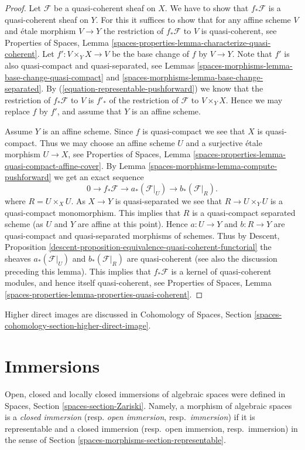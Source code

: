 \begin{proof}
Let $\mathcal{F}$ be a quasi-coherent sheaf on $X$. We have to show that
$f_*\mathcal{F}$ is a quasi-coherent sheaf on $Y$. For this it suffices
to show that for any affine scheme $V$ and \'etale morphism $V \to Y$
the restriction of $f_*\mathcal{F}$ to $V$ is quasi-coherent, see
Properties of Spaces,
Lemma \ref{spaces-properties-lemma-characterize-quasi-coherent}.
Let $f' : V \times_Y X \to V$
be the base change of $f$ by $V \to Y$. Note that $f'$ is also
quasi-compact and quasi-separated, see
Lemmas \ref{spaces-morphisms-lemma-base-change-quasi-compact} and
\ref{spaces-morphisms-lemma-base-change-separated}.
By (\ref{equation-representable-pushforward})
we know that the restriction of $f_*\mathcal{F}$ to $V$ is $f'_*$ of the
restriction of $\mathcal{F}$ to $V \times_Y X$. Hence
we may replace $f$ by $f'$, and assume that $Y$ is an affine scheme.

\medskip\noindent
Assume $Y$ is an affine scheme. Since $f$ is quasi-compact we see that $X$
is quasi-compact. Thus we may choose an affine scheme $U$ and a surjective
\'etale morphism $U \to X$, see
Properties of Spaces,
Lemma \ref{spaces-properties-lemma-quasi-compact-affine-cover}.
By Lemma \ref{spaces-morphisms-lemma-compute-pushforward} we get an exact sequence
$$
0 \to f_*\mathcal{F} \to a_*(\mathcal{F}|_U) \to b_*(\mathcal{F}|_R).
$$
where $R = U \times_X U$.
As $X \to Y$ is quasi-separated we see that $R \to U \times_Y U$
is a quasi-compact monomorphism. This implies that $R$ is a quasi-compact
separated scheme (as $U$ and $Y$ are affine at this point).
Hence $a : U \to Y$ and $b : R \to Y$ are quasi-compact and
quasi-separated morphisms of schemes. Thus by
Descent,
Proposition \ref{descent-proposition-equivalence-quasi-coherent-functorial}
the sheaves $a_*(\mathcal{F}|_U)$ and $b_*(\mathcal{F}|_R)$
are quasi-coherent (see also the discussion preceding this lemma).
This implies that $f_*\mathcal{F}$ is a kernel of
quasi-coherent modules, and hence itself quasi-coherent, see
Properties of Spaces,
Lemma \ref{spaces-properties-lemma-properties-quasi-coherent}.
\end{proof}

Higher direct images are discussed in
Cohomology of Spaces, Section
\ref{spaces-cohomology-section-higher-direct-image}.

\section{Immersions}
\label{spaces-morphisms-section-immersions}
Open, closed and locally closed immersions of algebraic spaces were defined in
Spaces, Section \ref{spaces-section-Zariski}.
Namely, a morphism of algebraic spaces is a
{\it closed immersion} (resp. {\it open immersion}, resp.\ {\it immersion})
if it is representable and a closed immersion (resp.\ open immersion,
resp.\ immersion) in the sense of Section \ref{spaces-morphisms-section-representable}.

